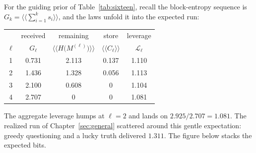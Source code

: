 \documentclass[11pt]{article}
\begin{document}
\begin{example}
For the guiding prior of Table~\ref{tab:sixteen}, recall the block-entropy sequence is
$G_k = \big\langle\!\big\langle \sum_{i=1}^{k} s_i \big\rangle\!\big\rangle$, and the laws unfold
it into the expected run:
\begin{center}
\begin{tabular}{c c c c c}
\toprule
 & received & remaining & store & leverage \\
$\ell$ & $G_\ell$
  & $\big\langle\!\big\langle H\big(M^{(\ell)}\big) \big\rangle\!\big\rangle$
  & $\langle\!\langle C_\ell \rangle\!\rangle$
  & $\mathcal L_\ell$ \\
\midrule
1 & 0.731 & 2.113 & 0.137 & 1.110 \\
2 & 1.436 & 1.328 & 0.056 & 1.113 \\
3 & 2.100 & 0.608 & 0     & 1.104 \\
4 & 2.707 & 0     & 0     & 1.081 \\
\bottomrule
\end{tabular}
\end{center}
The aggregate leverage humps at $\ell = 2$ and lands on
$2.925/2.707 = 1.081$. The realized run of
Chapter~\ref{sec:general} scattered around this gentle
expectation: greedy questioning and a lucky truth delivered
$1.311$. The figure below stacks the expected
bits.


\end{example}
\end{document}

